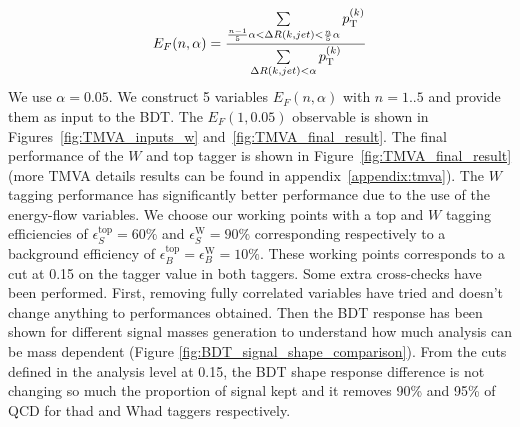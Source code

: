 \documentclass{cernrep}
\begin{document}
\begin{equation}
E_{F}(n,\alpha) =  \frac{\sum \limits_{\frac{n-1}{5}\alpha < \Delta R(k,jet)< \frac{n}{5}\alpha} p_{\text{T}}^{(k)}}{\sum \limits_{\Delta R(k,jet)< \alpha} p_{\text{T}}^{(k)}}
\end{equation}
\newline
We use $\alpha=0.05$. We construct 5 variables $E_{F}(n,\alpha)$ with $n=1..5$ and provide them as input to the BDT. The $E_{F}(1,0.05)$ observable is shown in 
Figures~\ref{fig:TMVA_inputs_w} and~\ref{fig:TMVA_final_result}.
The final performance of the $W$ and top tagger is shown in Figure~\ref{fig:TMVA_final_result} (more TMVA details results can be found in appendix~\ref{appendix:tmva}).
The $W$ tagging performance has significantly better performance due to the use of the energy-flow variables. We choose our working points with a top and $W$ tagging efficiencies of $\epsilon_S^{\text{top}}=60\%$ and $\epsilon_S^{\text{W}}=90\%$ corresponding respectively to a background efficiency of $\epsilon_B^{\text{top}}=\epsilon_B^{\text{W}}=10\%$. These working points corresponds to a cut at 0.15 on the tagger value in both taggers.
\newline
Some extra cross-checks have been performed. First, removing fully correlated variables have tried and doesn't change anything to performances obtained. Then the BDT response has been shown for different signal masses generation to understand how much analysis can be mass dependent (Figure \ref{fig:BDT_signal_shape_comparison}). From the cuts defined in the analysis level at 0.15, the BDT shape response difference is not changing so much the proportion of signal kept and it removes 90\% and 95\% of QCD for thad and Whad taggers respectively.
\end{document}
